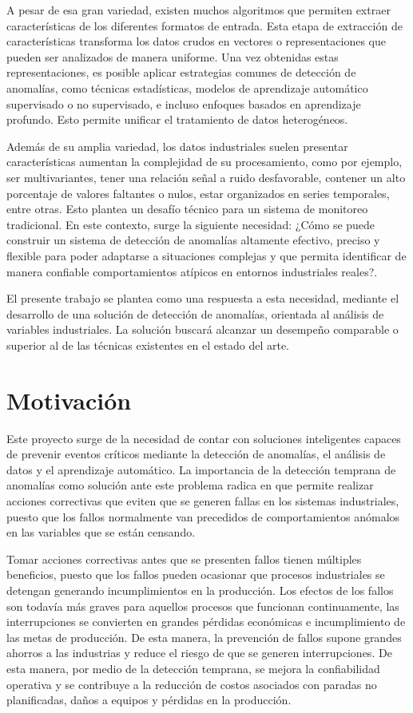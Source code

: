 \documentclass[11pt,a4paper,spanish]{book}
\numberwithin{equation}{chapter}
\numberwithin{figure}{chapter}
\begin{document}
A pesar de esa gran variedad, existen muchos algoritmos que permiten extraer 
características de los diferentes formatos de entrada. Esta etapa de extracción de 
características transforma los datos crudos en vectores o representaciones que 
pueden ser analizados de manera uniforme. Una vez obtenidas estas representaciones, 
es posible aplicar estrategias comunes de detección de anomalías, como técnicas 
estadísticas, modelos de aprendizaje automático supervisado o no supervisado, e 
incluso enfoques basados en aprendizaje profundo. Esto permite unificar el tratamiento 
de datos heterogéneos.


Además de su amplia variedad, los datos industriales suelen presentar características 
aumentan la complejidad de su procesamiento, como por ejemplo, ser multivariantes, tener
una relación señal a ruido desfavorable, contener un alto porcentaje de valores 
faltantes o nulos, estar organizados en series temporales, entre otras. Esto plantea un 
desafío técnico para un sistema de monitoreo tradicional. En este contexto, surge la 
siguiente necesidad: ¿Cómo se puede construir un sistema de detección de anomalías 
altamente efectivo, preciso y flexible para poder adaptarse a situaciones complejas y 
que permita identificar de manera confiable comportamientos atípicos en entornos 
industriales reales?. 


El presente trabajo se plantea como una respuesta a esta necesidad, mediante el 
desarrollo de una solución de detección de anomalías, orientada al análisis de variables
industriales. La solución buscará alcanzar un desempeño comparable o superior al de las
técnicas existentes en el estado del arte. 


\section{Motivación}

Este proyecto surge de la necesidad de contar con soluciones inteligentes capaces de 
prevenir eventos críticos mediante la detección de anomalías, el análisis de datos y el
aprendizaje automático. 
La  importancia de la detección temprana de anomalías como solución ante este problema 
radica en que permite realizar acciones correctivas que eviten que se generen fallas en 
los sistemas industriales, puesto que los fallos normalmente van precedidos de 
comportamientos anómalos en las variables que se están censando.


Tomar acciones correctivas antes que se presenten fallos tienen múltiples beneficios,
puesto que los fallos pueden ocasionar que procesos industriales se detengan generando
incumplimientos en la producción. Los efectos de los fallos son todavía más graves para
aquellos procesos que funcionan continuamente, las interrupciones se convierten en 
grandes pérdidas económicas e incumplimiento de las metas de producción. 
De esta manera, la prevención de fallos supone grandes ahorros a las industrias y reduce
el riesgo de que se generen interrupciones. De esta manera, por medio de la detección
temprana, se mejora la confiabilidad operativa y se contribuye a la reducción de costos
asociados con paradas no planificadas, daños a equipos y pérdidas en la producción.
\end{document}
